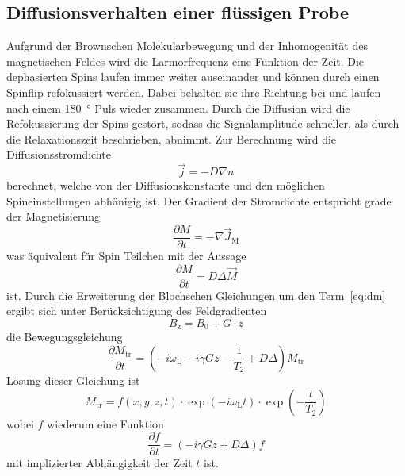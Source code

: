 \subsection{Diffusionsverhalten einer flüssigen Probe}%
\label{sub:relaxationsverhalten_einer_fluessigen_probe}
Aufgrund der Brownschen Molekularbewegung und der Inhomogenität des
magnetischen Feldes wird die Larmorfrequenz eine Funktion der Zeit.
Die dephasierten Spins laufen immer weiter auseinander und können durch einen
Spinflip refokussiert werden.
Dabei behalten sie ihre Richtung bei und laufen nach einem \SI{180}{\degree}
Puls wieder zusammen.
Durch die Diffusion wird die Refokussierung der Spins gestört, sodass die
Signalamplitude schneller, als durch die Relaxationszeit beschrieben, abnimmt.
Zur Berechnung wird die Diffusionsstromdichte
\begin{equation}
		\vec{j} = -D \nabla n
\end{equation}
berechnet, welche von der Diffusionskonstante und den möglichen
Spineinstellungen abhänigig ist.
Der Gradient der Stromdichte entspricht grade der Magnetisierung
\begin{equation}
		\frac{\partial M}{\partial t} = - \nabla \vec{J}_\text{M}
\end{equation}
was äquivalent für Spin  Teilchen mit der Aussage
\begin{equation}
		\label{eq:dm}
		\frac{\partial M}{\partial t} = D \Delta \vec{M}
\end{equation}
ist. Durch die Erweiterung der Blochschen Gleichungen um den Term~\ref{eq:dm}
ergibt sich unter Berücksichtigung des Feldgradienten
\begin{equation}
		\label{eq:gradB}
		B_\text{z} = B_0 + G \cdot z
\end{equation}
die Bewegungsgleichung
\begin{equation}
		\frac{\partial M_\text{tr}}{\partial t} = \left(- i \omega_\text{L} - i \gamma
Gz - \frac{1}{T_2} + D \Delta \right) M_\text{tr}
\end{equation}
Lösung dieser Gleichung ist
\begin{equation}
		M_\text{tr} = f(x,y,z,t) \cdot \exp(-i\omega_\text{L}t) \cdot
		\exp\left(-\frac{t}{T_\text{2}}\right)
\end{equation}
wobei $f$ wiederum eine Funktion
\begin{equation}
		\frac{\partial f}{\partial t} = \left(-i \gamma Gz + D \Delta \right) f
\end{equation}
mit implizierter Abhängigkeit der Zeit $t$ ist.
